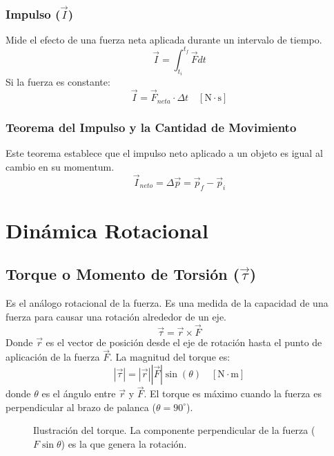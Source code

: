 \documentclass[11pt]{article}
\begin{document}
\subsubsection{Impulso ($\vec{I}$)}
Mide el efecto de una fuerza neta aplicada durante un intervalo de tiempo.
\[ \vec{I} = \int_{t_i}^{t_f} \vec{F} dt \]
Si la fuerza es constante:
\[ \vec{I} = \vec{F}_{neta} \cdot \Delta t \quad [\text{N} \cdot \text{s}] \]

\subsubsection{Teorema del Impulso y la Cantidad de Movimiento}
Este teorema establece que el impulso neto aplicado a un objeto es igual al cambio en su momentum.
\[ \vec{I}_{neto} = \Delta \vec{p} = \vec{p}_f - \vec{p}_i \]

\newpage

\section{Dinámica Rotacional}
\label{sec:dinamica_rotacional}

\subsection{Torque o Momento de Torsión ($\vec{\tau}$)}
Es el análogo rotacional de la fuerza. Es una medida de la capacidad de una fuerza para causar una rotación alrededor de un eje.
\[ \vec{\tau} = \vec{r} \times \vec{F} \]
Donde $\vec{r}$ es el vector de posición desde el eje de rotación hasta el punto de aplicación de la fuerza $\vec{F}$. La magnitud del torque es:
\[ |\vec{\tau}| = |\vec{r}| |\vec{F}| \sin(\theta) \quad [\text{N} \cdot \text{m}] \]
donde $\theta$ es el ángulo entre $\vec{r}$ y $\vec{F}$. El torque es máximo cuando la fuerza es perpendicular al brazo de palanca ($\theta=90^\circ$).

\begin{figure}[h!]
	\centering
	\caption{Ilustración del torque. La componente perpendicular de la fuerza ($F\sin\theta$) es la que genera la rotación.}
	\label{fig:torque}
\end{figure}
\end{document}
